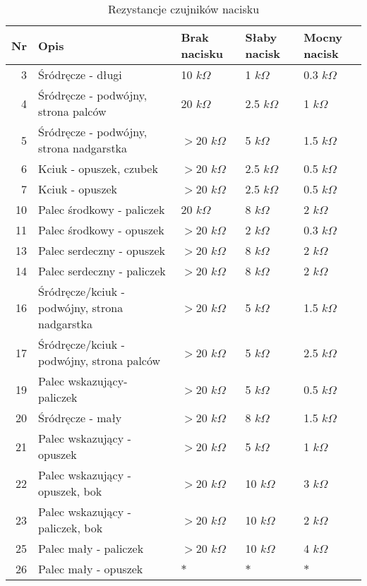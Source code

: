 \documentclass[10pt, a4paper]{article}
\begin{document}
\begin{table}[htbp]
  \centering
  \caption{Rezystancje czujników nacisku}
    \begin{tabular}{rllll}
    \toprule
    \multicolumn{1}{l}{Nr} & Opis  & Brak nacisku & Słaby nacisk & Mocny nacisk \\
    \midrule
    3     & Śródręcze - długi & 10 $k\Omega$   & 1 $k\Omega$    & 0.3 $k\Omega$ \\
    4     & Śródręcze - podwójny, strona palców & 20 $k\Omega$   & 2.5 $k\Omega$  & 1 $k\Omega$ \\
    5     & Śródręcze - podwójny, strona nadgarstka & $>$20 $k\Omega$  & 5 $k\Omega$    & 1.5 $k\Omega$ \\
    6     & Kciuk - opuszek, czubek & $>$20 $k\Omega$  & 2.5 $k\Omega$  & 0.5 $k\Omega$ \\
    7     & Kciuk - opuszek & $>$20 $k\Omega$  & 2.5 $k\Omega$  & 0.5 $k\Omega$ \\
    10    & Palec środkowy - paliczek & 20 $k\Omega$   & 8 $k\Omega$    & 2 $k\Omega$ \\
    11    & Palec środkowy - opuszek & $>$20 $k\Omega$  & 2 $k\Omega$    & 0.3 $k\Omega$ \\
    13    & Palec serdeczny - opuszek & $>$20 $k\Omega$  & 8 $k\Omega$    & 2 $k\Omega$ \\
    14    & Palec serdeczny - paliczek & $>$20 $k\Omega$  & 8 $k\Omega$    & 2 $k\Omega$ \\
    16    & Śródręcze/kciuk - podwójny, strona nadgarstka & $>$20 $k\Omega$  & 5 $k\Omega$    & 1.5 $k\Omega$ \\
    17    & Śródręcze/kciuk - podwójny, strona palców & $>$20 $k\Omega$  & 5 $k\Omega$    & 2.5 $k\Omega$ \\
    19    & Palec wskazujący- paliczek & $>$20 $k\Omega$  & 5 $k\Omega$    & 0.5 $k\Omega$ \\
    20    & Śródręcze - mały & $>$20 $k\Omega$  & 8 $k\Omega$    & 1.5 $k\Omega$ \\
    21    & Palec wskazujący - opuszek & $>$20 $k\Omega$  & 5 $k\Omega$    & 1 $k\Omega$ \\
    22    & Palec wskazujący - opuszek, bok & $>$20 $k\Omega$  & 10 $k\Omega$   & 3 $k\Omega$ \\
    23    & Palec wskazujący - paliczek, bok & $>$20 $k\Omega$  & 10 $k\Omega$   & 2 $k\Omega$ \\
    25    & Palec mały - paliczek & $>$20 $k\Omega$  & 10 $k\Omega$   & 4 $k\Omega$ \\
    26    & Palec mały - opuszek & $*$     & $*$     & $*$ \\
    \bottomrule
    \end{tabular}%
  \label{tab:rez_nacisk}%
\end{table}%
\end{document}
